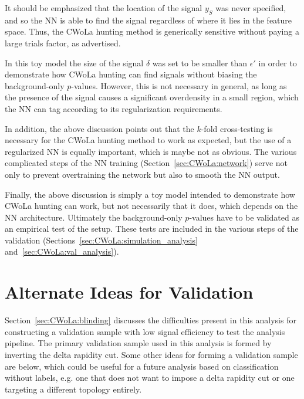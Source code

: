 It should be emphasized that the location of the signal $y_S$ was never specified, and so the NN is able to find the signal regardless of where it lies in the feature space.
Thus, the CWoLa hunting method is generically sensitive without paying a large trials factor, as advertised.

In this toy model the size of the signal $\delta$ was set to be smaller than $\epsilon'$ in order to demonstrate how CWoLa hunting can find signals without biasing the background-only $p$-values.
However, this is not necessary in general, as long as the presence of the signal causes a significant overdensity in a small region, which the NN can tag according to its regularization requirements. 

In addition, the above discussion points out that the $k$-fold cross-testing is necessary for the CWoLa hunting method to work as expected, but the use of a regularized NN is equally important, which is maybe not as obvious.
The various complicated steps of the NN training (Section~\ref{sec:CWoLa:network}) serve not only to prevent overtraining the network but also to smooth the NN output.

Finally, the above discussion is simply a toy model intended to demonstrate how CWoLa hunting can work, but not necessarily that it does, which depends on the NN architecture.
Ultimately the background-only $p$-values have to be validated as an empirical test of the setup.
These tests are included in the various steps of the validation (Sections~\ref{sec:CWoLa:simulation_analysis} and~\ref{sec:CWoLa:val_analysis}).

\section{Alternate Ideas for Validation}
\label{app:CWoLa:validation_alternate}
Section~\ref{sec:CWoLa:blinding} discusses the difficulties present in this analysis for constructing a validation sample with low signal efficiency to test the analysis pipeline.
The primary validation sample used in this analysis is formed by inverting the delta rapidity cut.
Some other ideas for forming a validation sample are below, which could be useful for a future analysis based on classification without labels, e.g. one that does not want to impose a delta rapidity cut or one targeting a different topology entirely.

